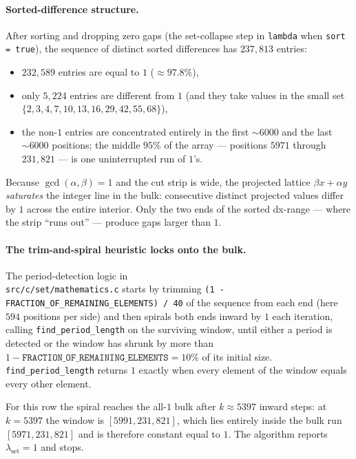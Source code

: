 \documentclass[11pt]{article}
\begin{document}
\paragraph{Sorted-difference structure.}
After sorting and dropping zero gaps (the set-collapse step in
\texttt{lambda} when \texttt{sort = true}), the sequence of distinct
sorted differences has $237{,}813$ entries:
\begin{itemize}
\item $232{,}589$ entries are equal to $1$ ($\approx 97.8\%$),
\item only $5{,}224$ entries are different from $1$ (and they take values
      in the small set \\ $\{2,3,4,7,10,13,16,29,42,55,68\}$),
\item the non-$1$ entries are concentrated entirely in the first
      $\sim\!6000$ and the last $\sim\!6000$ positions; the middle
      $95\%$ of the array — positions $5971$ through $231{,}821$ — is
      one uninterrupted run of $1$'s.
\end{itemize}
Because $\gcd(\alpha,\beta) = 1$ and the cut strip is wide, the
projected lattice $\beta x + \alpha y$ \emph{saturates} the integer line
in the bulk: consecutive distinct projected values differ by $1$ across
the entire interior. Only the two ends of the sorted dx-range — where
the strip ``runs out'' — produce gaps larger than $1$.

\paragraph{The trim-and-spiral heuristic locks onto the bulk.}
The period-detection logic in \\ \texttt{src/c/set/mathematics.c} starts by
trimming \texttt{(1 - FRACTION\_OF\_REMAINING\_ELEMENTS) / 40} of the
sequence from each end (here $594$ positions per side) and then spirals
both ends inward by $1$ each iteration, calling
\texttt{find\_period\_length} on the surviving window, until either a
period is detected or the window has shrunk by more than
$1 - \texttt{FRACTION\_OF\_REMAINING\_ELEMENTS} = 10\%$ of its initial
size. \texttt{find\_period\_length} returns $1$ exactly when every
element of the window equals every other element.

For this row the spiral reaches the all-$1$ bulk after $k \approx 5397$
inward steps: at $k = 5397$ the window is $[5991, 231{,}821]$, which lies
entirely inside the bulk run $[5971, 231{,}821]$ and is therefore
constant equal to $1$. The algorithm reports $\lambda_{\text{set}} = 1$
and stops.
\end{document}
